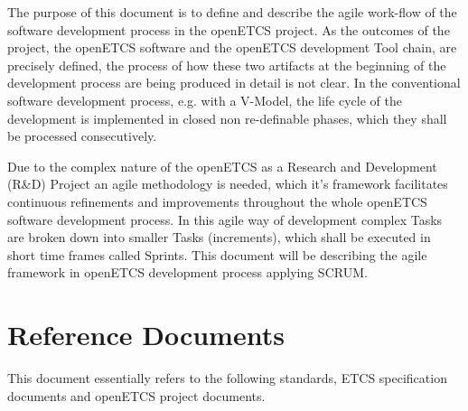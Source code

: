 The purpose of this document is to define and describe the agile work-flow of the software development process in the openETCS project. As the outcomes of the project, the openETCS software and the openETCS development Tool chain, are precisely defined, the process of how these two artifacts at the beginning of the development process are being produced in detail is not clear. In the conventional software development  process, e.g. with a V-Model, the life cycle of the development is implemented in closed non re-definable phases, which they shall be processed consecutively. 

Due to the complex nature of the openETCS as a  Research and Development (R\&D) Project an agile methodology is needed, which it's framework facilitates continuous refinements and improvements throughout the whole openETCS software development process. In this agile way of development complex Tasks are broken down into smaller Tasks (increments), which shall be executed in short time frames called Sprints. This document will be describing the agile framework in openETCS development process applying SCRUM.








\section{Reference Documents}
\label{sec:refdoc}

This document essentially refers to the following standards, ETCS specification documents and openETCS project documents.

